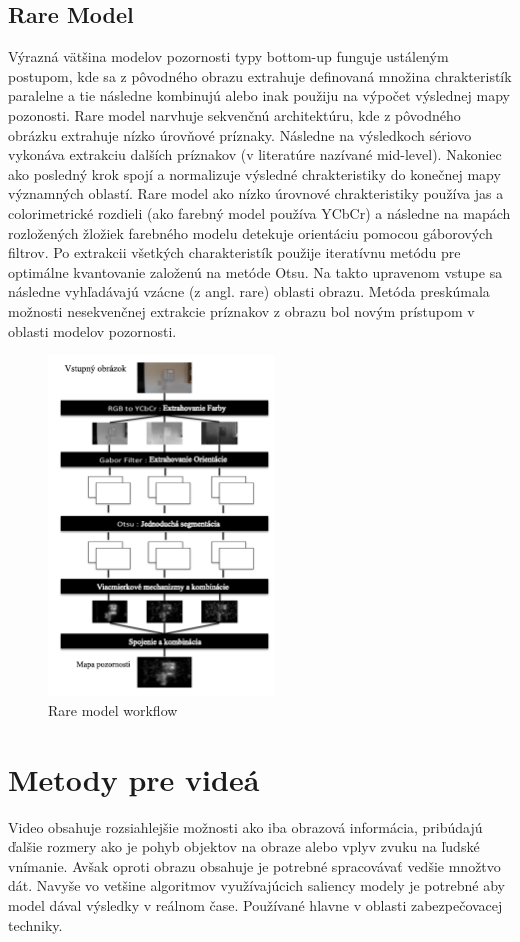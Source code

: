 \subsection{Rare Model}
Výrazná vätšina modelov pozornosti typy bottom-up funguje ustáleným postupom, kde sa z pôvodného obrazu extrahuje definovaná množina chrakteristík paralelne a tie následne kombinujú alebo inak použiju na výpočet výslednej mapy pozonosti.
Rare model narvhuje sekvenčnú architektúru, kde z pôvodného obrázku extrahuje nízko úrovňové príznaky.
Následne na výsledkoch sériovo vykonáva extrakciu dalších príznakov (v literatúre nazívané mid-level).
Nakoniec ako posledný krok spojí a normalizuje výsledné chrakteristiky do konečnej mapy významných oblastí.
Rare model ako nízko úrovnové chrakteristiky používa jas a colorimetrické rozdieli (ako farebný model používa YCbCr) a následne na mapách rozložených žložiek farebného modelu detekuje orientáciu pomocou gáborových filtrov\cite{rare-1}.
Po extrakcii všetkých charakteristík použije iteratívnu metódu pre optimálne kvantovanie založenú na metóde Otsu\cite{otsu}.
Na takto upravenom vstupe sa následne vyhľadávajú vzácne (z angl. rare) oblasti obrazu.
Metóda preskúmala možnosti nesekvenčnej extrakcie príznakov z obrazu bol novým prístupom v oblasti modelov pozornosti.

\begin{figure}[H]
  \centering
  \includegraphics[width=6cm]{pics/rare-1-svk.png}
  \caption{Rare model workflow\cite{rare-1}}\label{wrap-fig:3}
\end{figure}

\section{Metody pre videá}
Video obsahuje rozsiahlejšie možnosti ako iba obrazová informácia, pribúdajú ďalšie rozmery ako je pohyb objektov na obraze alebo vplyv zvuku na ľudské vnímanie.
Avšak oproti obrazu obsahuje je potrebné spracovávať vedšie množtvo
dát.
Navyše vo vetšine algoritmov využívajúcich saliency modely je potrebné aby model dával výsledky v reálnom čase.
Používané hlavne v oblasti zabezpečovacej techniky.

